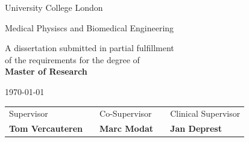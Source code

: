 \documentclass[a4paper,10pt]{book}
\theoremstyle{definition}
\begin{document}
\begin{titlepage}
\begin{center}
	\LARGE{\rm\expandafter{University College London}}\par
	\expandafter{\Large{Medical Physiscs and Biomedical Engineering}\par}
\end{center}

\vspace{1cm}

\begin{center}
	A dissertation submitted in partial fulfillment 
	\\
	of the requirements for the degree of
	\\ 
	{\bf Master of Research}	
\end{center}

\vspace{0.2cm}
\begin{center}
	\today
\end{center}

\vspace{2.0cm}

\begin{center}
\begin{tabular}{l p{1.5cm} l p{1.5cm} l}
	Supervisor&   & Co-Supervisor & &  Clinical Supervisor \\
	\textbf{Tom Vercauteren} &  & \textbf{Marc Modat}& & \textbf{Jan Deprest}  \\
\end{tabular}
\end{center}

\par
\vfill\par 

\endgroup


\end{titlepage}




 

\end{document}
